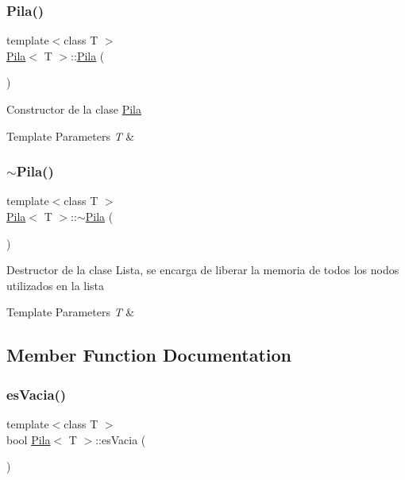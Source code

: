 \subsubsection{\texorpdfstring{Pila()}{Pila()}}
{\footnotesize\ttfamily template$<$class T $>$ \\
\mbox{\hyperlink{class_pila}{Pila}}$<$ T $>$\+::\mbox{\hyperlink{class_pila}{Pila}} (\begin{DoxyParamCaption}{ }\end{DoxyParamCaption})}

Constructor de la clase \mbox{\hyperlink{class_pila}{Pila}} 
\begin{DoxyTemplParams}{Template Parameters}
{\em T} & \\
\hline
\end{DoxyTemplParams}
\mbox{\label{class_pila_a5bc38b4a06fdc0c1abc8736ebc5ba839}} 
\subsubsection{\texorpdfstring{$\sim$\+Pila()}{~Pila()}}
{\footnotesize\ttfamily template$<$class T $>$ \\
\mbox{\hyperlink{class_pila}{Pila}}$<$ T $>$\+::$\sim$\mbox{\hyperlink{class_pila}{Pila}} (\begin{DoxyParamCaption}{ }\end{DoxyParamCaption})}

Destructor de la clase Lista, se encarga de liberar la memoria de todos los nodos utilizados en la lista 
\begin{DoxyTemplParams}{Template Parameters}
{\em T} & \\
\hline
\end{DoxyTemplParams}


\subsection{Member Function Documentation}
\mbox{\label{class_pila_a8d946f60460f1a02ad0880acc1aa679e}} 
\subsubsection{\texorpdfstring{es\+Vacia()}{esVacia()}}
{\footnotesize\ttfamily template$<$class T $>$ \\
bool \mbox{\hyperlink{class_pila}{Pila}}$<$ T $>$\+::es\+Vacia (\begin{DoxyParamCaption}{ }\end{DoxyParamCaption})}

